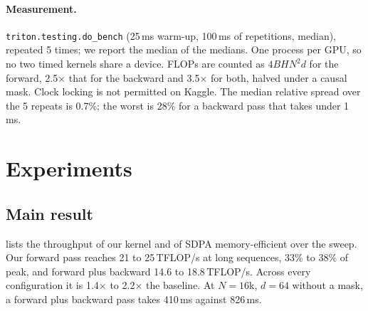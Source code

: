 \documentclass[10pt,twocolumn,letterpaper]{article}
\newcommand{\TF}{\,TFLOP/s}
\begin{document}
\paragraph{Measurement.}
\texttt{triton.testing.do\_bench} (25\,ms warm-up, 100\,ms of repetitions,
median), repeated 5 times; we report the median of the medians. One process
per GPU, so no two timed kernels share a device. FLOPs are counted as
$4 B H N^2 d$ for the forward, 2.5$\times$ that for the backward and
3.5$\times$ for both, halved under a causal mask. Clock locking is not
permitted on Kaggle. The median relative spread over the 5 repeats is 0.7\%;
the worst is 28\% for a backward pass that takes under 1\,ms.

\section{Experiments}
\label{sec:exp}

\subsection{Main result}
 lists the throughput of our kernel and of SDPA
memory-efficient over the sweep. Our forward pass reaches 21 to 25\TF{} at long
sequences, 33\% to 38\% of peak, and forward plus backward 14.6 to 18.8\TF{}.
Across every configuration it is 1.4$\times$ to 2.2$\times$ the baseline. At
$N = 16$k, $d = 64$ without a mask, a forward plus backward pass takes 410\,ms
against 826\,ms.
\end{document}
